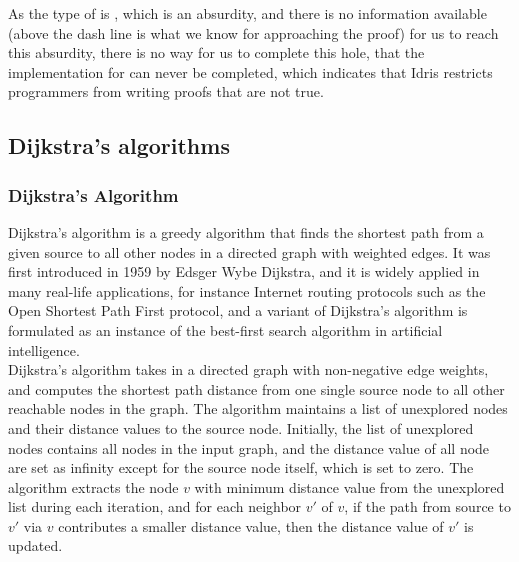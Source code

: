 As the type of  is , which is an absurdity, and there is no information available (above the dash line is what we know for approaching the proof) for us to reach this absurdity, there is no way for us to complete this hole, that the implementation for  can never be completed, which indicates that Idris restricts programmers from writing proofs that are not true. 
 
\subsection{Dijkstra's algorithms}
\subsubsection*{Dijkstra's Algorithm}
Dijkstra's algorithm is a greedy algorithm that finds the shortest path from a given source to all other nodes in a directed graph with weighted edges. It was first introduced in 1959 by Edsger Wybe Dijkstra\cite{Dijkstras}, and it is widely applied in many real-life applications, for instance Internet routing protocols such as the Open Shortest Path First protocol, and a variant of Dijkstra's algorithm is formulated as an instance of the best-first search algorithm in artificial intelligence. 
\\

Dijkstra's algorithm takes in a directed graph with non-negative edge weights, and computes the shortest path distance from one single source node to all other reachable nodes in the graph. The algorithm maintains a list of unexplored nodes and their distance values to the source node. Initially, the list of unexplored nodes contains all nodes in the input graph, and the distance value of all node are set as infinity except for the source node itself, which is set to zero. The algorithm extracts the node $v$ with minimum distance value from the unexplored list during each iteration, and for each neighbor $v'$ of $v$, if the path from source to $v'$ via $v$ contributes a smaller distance value, then the distance value of $v'$ is updated. 

